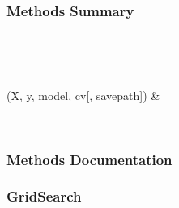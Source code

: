 \documentclass[letterpaper,10pt,english]{sphinxmanual}
\begin{document}
\begin{fulllineitems}
\begin{description}
\begin{description}
\begin{description}
\end{description}

\end{description}

\end{description}
\subsubsection*{Methods Summary}


\begin{savenotes}\sphinxatlongtablestart\begin{longtable}[c]{}
\hline

\endfirsthead

%
{}\\
\hline

\endhead

\hline
{}\\
\endfoot

\endlastfoot

{\hyperref[\detokenize{api/mastml.hyper_opt.BayesianSearch:mastml.hyper_opt.BayesianSearch.fit}]{}}(X, y, model, cv{[}, savepath{]})
&

\\
\hline
\end{longtable}\sphinxatlongtableend\end{savenotes}
\subsubsection*{Methods Documentation}

\begin{fulllineitems}
\label{\detokenize{api/mastml.hyper_opt.BayesianSearch:mastml.hyper_opt.BayesianSearch.fit}}
\end{fulllineitems}


\end{fulllineitems}



\subsubsection{GridSearch}
\label{\detokenize{api/mastml.hyper_opt.GridSearch:gridsearch}}\label{\detokenize{api/mastml.hyper_opt.GridSearch::doc}}
\end{document}
